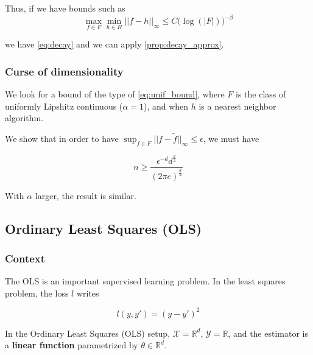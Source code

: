 \documentclass[
10pt, %
a4paper, %
oneside, %
headinclude,footinclude, %
BCOR5mm, %
]{scrartcl}
\begin{document}
    Thus, if we have bounds such as
    \begin{equation}
	\label{eq:unif_bound}
\max_{f\in F}\min_{h\in H}||f-h||_{\infty}\leq C\big( \log(|F|) \big)^{-\beta}  
    \end{equation}

    we have \ref{eq:decay} and we can apply \ref{prop:decay_approx}.

    \subsubsection{\large\color{Periwinkle}Curse of dimensionality}

    We look for a bound of the type of \ref{eq:unif_bound}, where $F$ is the class of uniformly Lipshitz continuous ($\alpha=1$), and when  $h$ is a nearest neighbor algorithm.

    We show that in order to have $ \sup_{f\in F}||f- \tilde{f}||_{\infty}\leq \epsilon$, we must have

    \begin{equation*}
	n\geq \frac{\epsilon^{-d}d^{ \frac{d}{2} }}{(2\pi e)^{ \frac{d}{2} } }
    \end{equation*}

    \begin{remark}
        With $\alpha$ larger, the result is similar.
    \end{remark}


\subsection{\large\color{MidnightBlue}Ordinary Least Squares (OLS)}
\label{subsec:ols}

\subsubsection{\large\color{Periwinkle}Context}
\label{con:ols}

The OLS is an important supervised learning problem. In the least squares problem, the loss $l$ writes 

\begin{equation*}
    l(y,y') = (y-y')^2
\end{equation*}

In the Ordinary Least Squares (OLS) setup, $ \mathcal{X} = \mathbb{R}^d$, $ \mathcal{Y}  = \mathbb{R} $, and the estimator is a \textbf{{linear function}} parametrized by $ \theta\in \mathbb{R}^d$.
\end{document}
